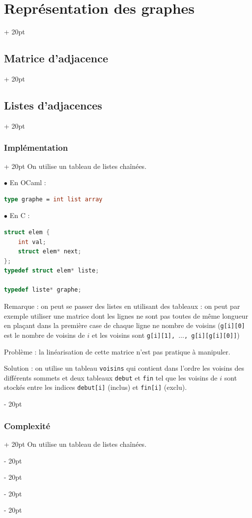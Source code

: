 \documentclass[a4paper, 12pt, twoside]{article}
\newcommand{\ind}[1][20pt]{\advance\leftskip + #1}
\newcommand{\deind}[1][20pt]{\advance\leftskip - #1}
\newenvironment{indt}[2][20pt]{#2 \par \ind[#1]}{\par \deind} %
\begin{document}
\begin{indt}{\section{Représentation des graphes}}
\begin{indt}{\subsection{Matrice d'adjacence}}
\begin{indt}{\subsection{Listes d'adjacences}}
                \vspace{12pt}
                
                \begin{indt}{\subsubsection{Implémentation}}
                    On utilise un tableau de listes chaînées.

                    $\bullet$ En OCaml :

                    \begin{lstlisting}[language=Caml, xleftmargin=100pt]
type graphe = int list array\end{lstlisting}

                    $\bullet$ En C :

                    \begin{lstlisting}[language=C, xleftmargin=100pt]
struct elem {
    int val;
    struct elem* next;
};
typedef struct elem* liste;

typedef liste* graphe;\end{lstlisting}
                    
                    \vspace{6pt}
                    
                    Remarque : on peut se passer des listes en utilisant des tableaux : on peut par exemple utiliser une matrice dont les lignes ne sont pas toutes de même longueur en plaçant dans la première case de chaque ligne ne nombre de voisins (\texttt{g[i][0]} est le nombre de voisins de $i$ et les voisins sont \texttt{g[i][1], $\ldots$, g[i][g[i][0]]})

                    Problème : la linéarisation de cette matrice n'est pas pratique à manipuler.

                    Solution : on utilise un tableau \texttt{voisins} qui contient dans l'ordre les voisins des différents sommets et deux tableaux \texttt{debut} et \texttt{fin} tel que les voisins de $i$ sont stockés entre les indices \texttt{debut[i]} (inclus) et \texttt{fin[i]} (exclu).
                \end{indt}

                \vspace{12pt}
                
                \begin{indt}{\subsubsection{Complexité}}
                    On utilise un tableau de listes chaînées.


\end{indt}
\end{indt}
\end{indt}
\end{indt}
\end{document}

